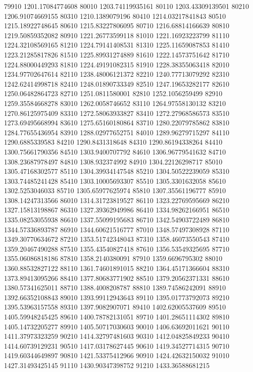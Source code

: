 {79910 1201.17084774608
80010 1203.74119935161
80110 1203.43309139501
80210 1206.91074669155
80310 1210.1389079196
80410 1214.03217841843
80510 1215.18922748645
80610 1215.83227806095
80710 1216.68814166639
80810 1219.50859352082
80910 1221.26773599118
81010 1221.16923223799
81110 1224.32108569165
81210 1224.79141408531
81310 1225.11659087853
81410 1223.21285817826
81510 1225.89931274889
81610 1222.14573751642
81710 1224.88000449293
81810 1224.49191082315
81910 1228.38355063418
82010 1234.97702647614
82110 1238.48006121372
82210 1240.77713079292
82310 1242.62414998718
82410 1248.01890733349
82510 1247.19653282177
82610 1250.06482864723
82710 1251.0811580001
82810 1252.1056259499
82910 1259.35584668278
83010 1262.0058746652
83110 1264.97558130132
83210 1270.86125975409
83310 1272.58063933827
83410 1272.27968586573
83510 1273.69495668994
83610 1275.65160180864
83710 1280.22079785862
83810 1284.77655436954
83910 1288.02977652751
84010 1289.96279715297
84110 1290.6885339583
84210 1290.8431318648
84310 1290.86194338264
84410 1300.75661790356
84510 1303.9400707792
84610 1306.96779541632
84710 1308.23687978497
84810 1308.932374992
84910 1304.22126298717
85010 1305.47168302577
85110 1304.39934147548
85210 1304.50522239059
85310 1303.74485241428
85410 1303.10005693307
85510 1305.3301632058
85610 1302.5253046033
85710 1305.65977625974
85810 1307.35561196777
85910 1308.14247313566
86010 1314.31723819527
86110 1323.22769595669
86210 1327.15813198867
86310 1327.39362949986
86410 1334.98262166951
86510 1335.08253055938
86610 1337.55099195683
86710 1342.54903722489
86810 1344.57336893787
86910 1344.60621516777
87010 1348.57497308928
87110 1349.30770634672
87210 1353.51742348043
87310 1358.46073550543
87410 1359.20467490288
87510 1355.43540827418
87610 1356.53549325695
87710 1355.06086818186
87810 1358.2140380091
87910 1359.6696795302
88010 1360.88532827122
88110 1361.74601891015
88210 1364.45171366604
88310 1373.89413095266
88410 1377.80683771902
88510 1379.20562371331
88610 1380.57341625011
88710 1388.4008208787
88810 1389.74586242091
88910 1392.66352108843
89010 1393.99112943643
89110 1395.01773792073
89210 1395.53963157558
89310 1397.9082907071
89410 1402.62005537609
89510 1405.59948245425
89610 1400.78782131051
89710 1401.28651114302
89810 1405.14732205277
89910 1405.50717030603
90010 1406.63692011621
90110 1411.37973323259
90210 1414.32797481603
90310 1412.04825849233
90410 1414.60739129231
90510 1417.03178627445
90610 1419.34527714315
90710 1419.60344649897
90810 1421.53375412966
90910 1424.42632150032
91010 1427.31493425145
91110 1430.90347398752
91210 1433.36588681215
}

